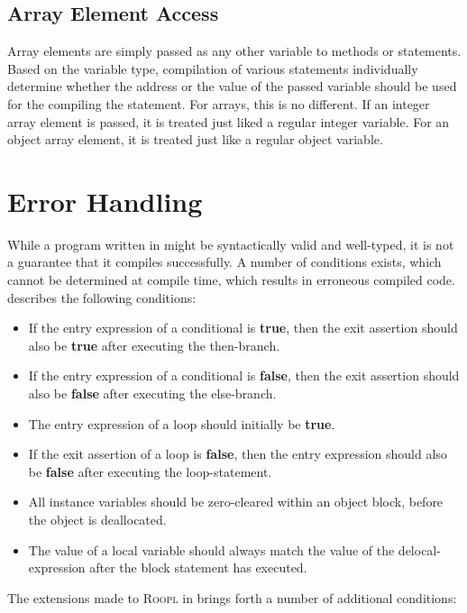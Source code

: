 \subsection{Array Element Access}
\label{subsec:array-element-access}
Array elements are simply passed as any other variable to methods or statements. Based on the variable type, compilation of various statements individually determine whether the address or the value of the passed variable should be used for the compiling the statement. For arrays, this is no different. If an integer array element is passed, it is treated just liked a regular integer variable. For an object array element, it is treated just like a regular object variable. 


\section{Error Handling}
\label{sec:error-handling}

While a program written in \rooplpp might be syntactically valid and well-typed, it is not a guarantee that it compiles successfully. A number of conditions exists, which cannot be determined at compile time, which results in erroneous compiled code. \citeauthor{th:roopl} describes the following conditions:

\begin{itemize}
    \item If the entry expression of a conditional is \textbf{true}, then the exit assertion should also be \textbf{true} after executing the then-branch.
    \item If the entry expression of a conditional is \textbf{false}, then the exit assertion should also be \textbf{false} after executing the else-branch.
    \item The entry expression of a loop should initially be \textbf{true}.
    \item If the exit assertion of a loop is \textbf{false}, then the entry expression should also be \textbf{false} after executing the loop-statement.
    \item All instance variables should be zero-cleared within an object block, before the object is deallocated.
    \item The value of a local variable should always match the value of the delocal-expression after the block statement has executed.
\end{itemize}

The extensions made to \textsc{Roopl} in \rooplpp brings forth a number of additional conditions:

